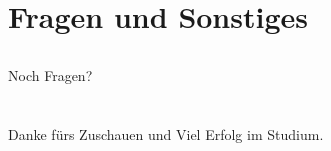 \livecoding

\section{Fragen und Sonstiges}
\subsection{}

\begin{frame}
	\slidehead
	\vspace{1.8cm}
	\centering
	\huge Noch Fragen?
\end{frame}

\section{}
\subsection{}

\begin{frame}
	\slidehead
	\vspace{1.8cm}
	\centering
	\huge Danke fürs Zuschauen und Viel Erfolg im Studium.
\end{frame}


